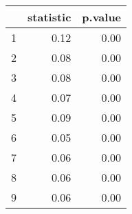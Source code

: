 \begin{table}[ht]
\centering
\begin{tabular}{rrr}
  \hline
 & statistic & p.value \\ 
  \hline
1 & 0.12 & 0.00 \\ 
  2 & 0.08 & 0.00 \\ 
  3 & 0.08 & 0.00 \\ 
  4 & 0.07 & 0.00 \\ 
  5 & 0.09 & 0.00 \\ 
  6 & 0.05 & 0.00 \\ 
  7 & 0.06 & 0.00 \\ 
  8 & 0.06 & 0.00 \\ 
  9 & 0.06 & 0.00 \\ 
   \hline
\end{tabular}
\end{table}

